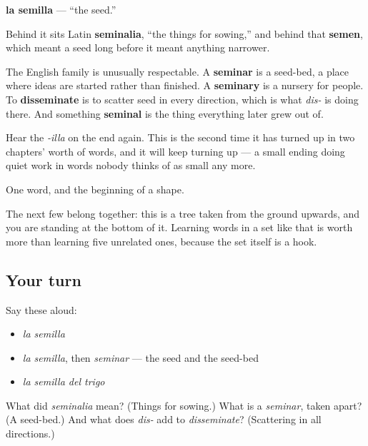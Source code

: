 \begin{cousinweb}
\textbf{la semilla} — \textquotedblleft{}the seed.\textquotedblright{}

Behind it sits Latin \textbf{seminalia}, \textquotedblleft{}the things for sowing,\textquotedblright{} and behind that \textbf{semen}, which meant a seed long before it meant anything narrower.

The English family is unusually respectable. A \textbf{seminar} is a seed-bed, a place where ideas are started rather than finished. A \textbf{seminary} is a nursery for people. To \textbf{disseminate} is to scatter seed in every direction, which is what \emph{dis-} is doing there. And something \textbf{seminal} is the thing everything later grew out of.

Hear the \emph{-illa} on the end again. This is the second time it has turned up in two chapters' worth of words, and it will keep turning up — a small ending doing quiet work in words nobody thinks of as small any more.
\end{cousinweb}

\begin{grammarlens}[title={What you've built}]
One word, and the beginning of a shape.

The next few belong together: this is a tree taken from the ground upwards, and you are standing at the bottom of it. Learning words in a set like that is worth more than learning five unrelated ones, because the set itself is a hook.
\end{grammarlens}

\subsection*{Your turn}
Say these aloud:

\begin{itemize}
\raggedright
  \item \emph{la semilla}
  \item \emph{la semilla}, then \emph{seminar} — the seed and the seed-bed
  \item \emph{la semilla del trigo}
\end{itemize}

\begin{tcolorbox}[breakable,colback=teal!4,colframe=teal!35!black,title={Before you move on}]
What did \emph{seminalia} mean? (Things for sowing.) What is a \emph{seminar}, taken apart? (A seed-bed.) And what does \emph{dis-} add to \emph{disseminate}? (Scattering in all directions.)
\end{tcolorbox}
